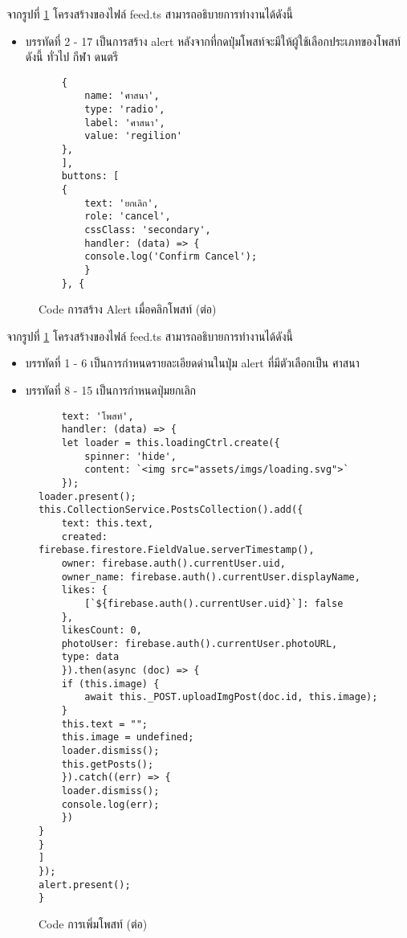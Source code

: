 จากรูปที่ \ref{Fig:4-addpost} โครงสร้างของไฟล์ feed.ts สามารถอธิบายการทำงานได้ดังนี้
\begin{itemize}[label={--}]
\item บรรทัดที่ 2 - 17 เป็นการสร้าง alert หลังจากที่กดปุ่มโพสท์จะมีให้ผู้ใช้เลือกประเภทของโพสท์ดังนี้ ทั่วไป กีฬา ดนตรี
\end{itemize}


\begin{figure}[H]
	{\lstset{language=Pascal}
	\begin{lstlisting}
	{
		name: 'ศาสนา',
		type: 'radio',
		label: 'ศาสนา',
		value: 'regilion'
	},
	],
	buttons: [
	{
		text: 'ยกเลิก',
		role: 'cancel',
		cssClass: 'secondary',
		handler: (data) => {
		console.log('Confirm Cancel');
		}
	}, {
	\end{lstlisting}}
	
	\caption{Code การสร้าง Alert เมื่อคลิกโพสท์ (ต่อ)}
	\label{Fig:4-addpost}
	\end{figure}
	
	จากรูปที่ \ref{Fig:4-addpost} โครงสร้างของไฟล์ feed.ts สามารถอธิบายการทำงานได้ดังนี้
	\begin{itemize}[label={--}]
	\item บรรทัดที่ 1 - 6 เป็นการกำหนดรายละเอียดด่านในปุ่ม alert ที่มีตัวเลือกเป็น ศาสนา
	\item บรรทัดที่ 8 - 15 เป็นการกำหนดปุ่มยกเลิก
	\end{itemize}
	\newpage
	


\begin{figure}[H]
	{\lstset{language=Pascal}
	\begin{lstlisting}
	text: 'โพสท์',
	handler: (data) => {        
	let loader = this.loadingCtrl.create({
		spinner: 'hide',
		content: `<img src="assets/imgs/loading.svg">`
	});
loader.present();
this.CollectionService.PostsCollection().add({
	text: this.text,
	created: firebase.firestore.FieldValue.serverTimestamp(),
	owner: firebase.auth().currentUser.uid,
	owner_name: firebase.auth().currentUser.displayName,
	likes: {
		[`${firebase.auth().currentUser.uid}`]: false
	},
	likesCount: 0,
	photoUser: firebase.auth().currentUser.photoURL,
	type: data
	}).then(async (doc) => {
	if (this.image) {
		await this._POST.uploadImgPost(doc.id, this.image);
	}
	this.text = "";
	this.image = undefined;
	loader.dismiss();
	this.getPosts();
	}).catch((err) => {
	loader.dismiss();
	console.log(err);
	})
}
}
]
});
alert.present();
}
	\end{lstlisting}}
	\caption{Code การเพิ่มโพสท์ (ต่อ)}
	\label{Fig:4-addpostcon1}
	\end{figure}
	\newpage
	
